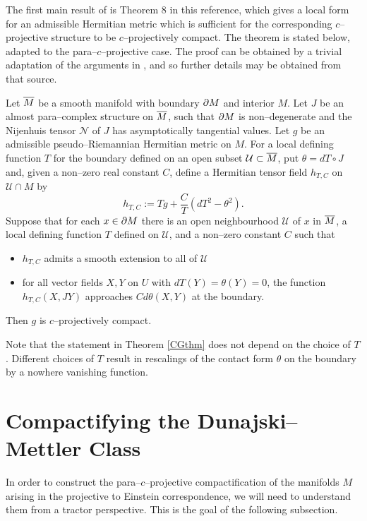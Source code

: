 The first main result of \cite{CG} is  Theorem 8 in this reference, which gives a local form for an admissible Hermitian metric which is sufficient for the corresponding $c$--projective structure to be $c$--projectively compact. The theorem is stated below, adapted to the para--$c$--projective case. The proof can be obtained by a trivial adaptation of the arguments in
\cite{CG}, and so further details may be obtained from that source.
\begin{theo}[\cite{CG}] \label{CGthm}
Let $\overline{M}$ be a smooth manifold with boundary $\partial M$ and interior $M$. Let $J$ be an almost para--complex structure on $\overline{M}$, such that $\partial M$ is non--degenerate and the Nijenhuis tensor $\mathcal{N}$ of $J$ has asymptotically tangential values. Let $g$ be an admissible pseudo--Riemannian Hermitian metric on $M$. For a local defining function $T$ for the boundary defined on an open 
subset ${\mathcal U}\subset \overline{M}$, put $\theta=dT\circ J$ and, given a non--zero real 
constant $C$, define a Hermitian tensor field $h_{T,C}$ on 
${\mathcal U}\cap M$ by
\[
h_{T,C}:=Tg+\frac{C}{T}(dT^2-\theta^2).
\]
Suppose that for each $x\in\partial M$ there is an open neighbourhood 
${\mathcal{U}}$ of $x$ in $\overline{M}$, a local defining function $T$ defined on 
${\mathcal{U}}$, and a non--zero constant $C$ such that
\begin{itemize}
\item $h_{T,C}$ admits a smooth extension to all of $\mathcal{U}$
\item for all vector fields $X,Y$ on $U$ with $dT(Y)=\theta(Y)=0$, the function $h_{T,C}(X,JY)$ approaches $Cd\theta(X,Y)$ at the boundary.
\end{itemize}
Then $g$ is $c$--projectively compact.
\end{theo}
Note that the statement in  Theorem \ref{CGthm} does not depend on the choice of $T$. Different choices of $T$ result in rescalings of the contact form $\theta$ on the boundary by a nowhere vanishing function.


\section{Compactifying the Dunajski--Mettler Class} 

In order to construct the para--$c$--projective compactification of the manifolds $M$ arising in the projective to Einstein correspondence, we will need to understand them from a tractor perspective. This is the goal of the following subsection.

